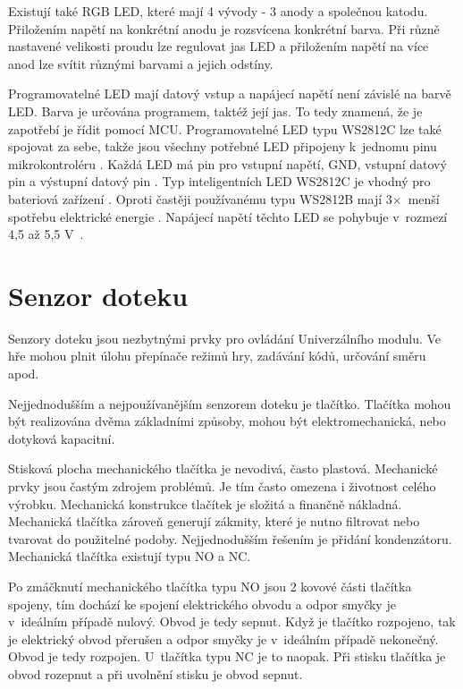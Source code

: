 Existují také RGB LED, které mají 4 vývody - 3 anody a společnou katodu. 
Přiložením napětí na konkrétní anodu je rozsvícena konkrétní barva. Při různě nastavené velikosti proudu lze regulovat jas LED 
a přiložením napětí na více anod lze svítit různými barvami a jejich odstíny. 

Programovatelné LED mají datový vstup a napájecí napětí není závislé na barvě LED. 
Barva je určována programem, taktéž její jas. To tedy znamená, že je zapotřebí je řídit 
pomocí MCU. Programovatelné LED typu WS2812C lze také spojovat za sebe, takže jsou všechny potřebné LED připojeny k~jednomu pinu 
mikrokontroléru \cite{WS2812C_dtsh}. Každá LED má pin pro vstupní napětí, GND, vstupní datový pin a výstupní datový pin \cite{WS2812C_dtsh}. Typ inteligentních 
LED WS2812C je vhodný pro bateriová zařízení \cite{WS2812C_dtsh}. Oproti častěji používanému typu WS2812B mají 3$\times$~menší spotřebu elektrické energie \cite{WS2812C_dtsh}. 
Napájecí napětí těchto LED se pohybuje v~rozmezí 4,5 až 5,5 V~\cite{WS2812C_dtsh}. 

\section{Senzor doteku}
Senzory doteku jsou nezbytnými prvky pro ovládání Univerzálního modulu. Ve hře mohou plnit úlohu přepínače režimů hry, zadávání kódů, 
určování směru apod. 

Nejjednodušším a nejpoužívanějším senzorem doteku je tlačítko. 
Tlačítka mohou být realizována dvěma základními způsoby, mohou být elektromechanická, nebo dotyková kapacitní. 

Stisková plocha mechanického tlačítka je nevodivá, často plastová. Mechanické prvky jsou častým zdrojem problémů. Je tím často omezena i 
životnost celého výrobku. Mechanická konstrukce tlačítek je složitá a finančně nákladná. Mechanická tlačítka zároveň generují zákmity, které 
je nutno filtrovat nebo tvarovat do použitelné podoby. Nejjednodušším řešením je přidání kondenzátoru. Mechanická tlačítka existují typu NO 
a NC. 

Po zmáčknutí mechanického tlačítka typu NO jsou 2 kovové části tlačítka spojeny, tím dochází ke spojení elektrického obvodu 
a odpor smyčky je v~ideálním případě nulový. Obvod je tedy sepnut. Když je tlačítko rozpojeno, tak je 
elektrický obvod přerušen a odpor smyčky je v~ideálním případě nekonečný. Obvod je tedy rozpojen. U~tlačítka typu NC je to naopak. Při stisku 
tlačítka je obvod rozepnut a při uvolnění stisku je obvod sepnut. 

